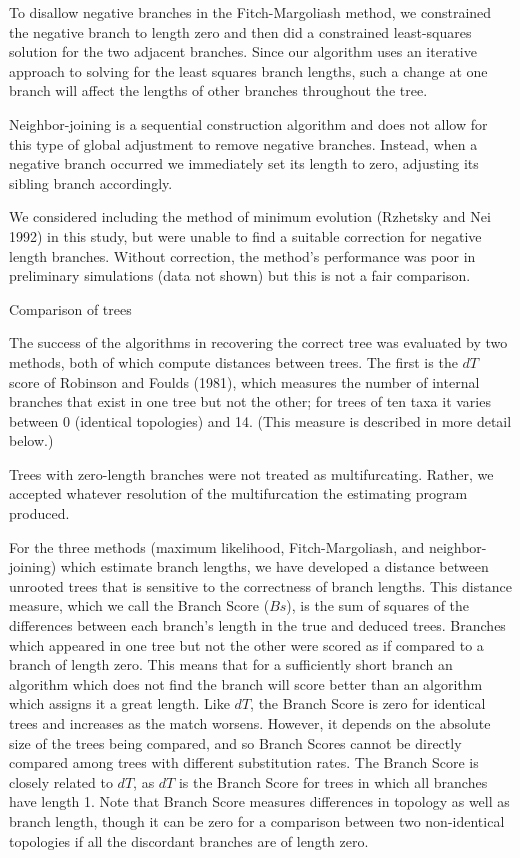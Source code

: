 To disallow negative branches in the Fitch-Margoliash method, we
constrained the negative branch to length zero and then did a
constrained least-squares solution for the two adjacent branches.  Since
our algorithm uses an iterative approach to solving for the least
squares branch lengths, such a change at one branch will affect the
lengths of other branches throughout the tree.

Neighbor-joining is a sequential construction algorithm and does not
allow for this type of global adjustment to remove negative branches.
Instead, when a negative branch occurred we immediately set its length to
zero, adjusting its sibling branch accordingly. 

We considered including the method of minimum evolution (Rzhetsky and
Nei 1992) in this study, but were unable to find a suitable correction
for negative length branches.  Without correction, the method's
performance was poor in preliminary simulations (data not shown) but
this is not a fair comparison.

\bigskip

\bigskip

\noindent
Comparison of trees
\bigskip


The success of the algorithms in recovering the correct tree was evaluated by
two methods, both of which compute distances between trees.
The first is the $dT$ score of Robinson and Foulds 
(1981), which measures the number of internal branches that exist in 
one tree but not the other; for trees of ten taxa it varies between 0 
(identical topologies) and 14.  (This measure is described in more
detail below.)

Trees with zero-length branches were not treated as multifurcating.  Rather, 
we accepted whatever resolution of the multifurcation the
estimating program produced.

For the three methods (maximum likelihood, Fitch-Margoliash, and
neighbor-joining) which 
estimate branch lengths, we have developed a distance between unrooted
trees that
is sensitive to the correctness of branch lengths.  This distance measure,
which we call the Branch Score ($Bs$), is the sum of
squares of the differences between each branch's length in the true 
and deduced trees.  Branches which appeared in one tree but not the 
other were scored as if compared to a branch of length zero.  This 
means that for a sufficiently short branch an algorithm which does 
not find the branch will score better than an algorithm which 
assigns it a great length.  Like $dT$, the Branch Score is zero for 
identical trees and increases as the match worsens.  However, it 
depends on the absolute size of the trees being compared, and so 
Branch Scores cannot be directly compared among trees with 
different substitution rates.  The Branch Score is closely related to $dT$,
as $dT$ is the
Branch Score for trees in which all branches have length 1.  Note that
Branch Score measures differences in topology as well as branch length,
though it can be zero for a comparison between two non-identical
topologies if all the discordant branches are of length zero.

